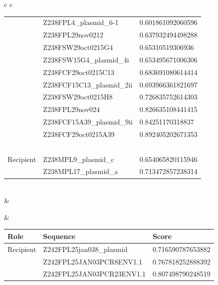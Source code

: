 \documentclass[conference]{IEEEtran}
\begin{document}
\begin{table}[]
\begin{tabular}{ c c}
\begin{tabular}{l l l}
&	Z238FPL4\_plasmid\_6-1	&	0.601861092060596	\\
&	Z238FPL29nov0212	&	0.637932494498288	\\
&	Z238FSW29oct0215G4	&	0.65310519306936	\\
&	Z238FSW15G4\_plasmid\_4i	&	0.653495671006306	\\
&	Z238FCF29oct0215C13	&	0.683691080614414	\\
&	Z238FCF15C13\_plasmid\_2ii	&	0.693966361821697	\\
&	Z238FSW29oct0215H8	&	0.726835752614303	\\
&	Z238FPL29nov024	&	0.826635108441415	\\
&	Z238FCF15A39\_plasmid\_9ii	&	0.84251170318837	\\
&	Z238FCF29oct0215A39	&	0.892405202671353	\\

	& \ &\ \\
	\hline
Recipient &	Z238MPL9\_plasmid\_c	&	0.654065820115946	\\
&	Z238MPL17\_plasmid\_a	&	0.713472857238314	\\

\end{tabular}\\
\hline
& \ \\
\begin{minipage}{.4\textwidth}
\end{minipage}
&	\begin{tabular}{l l l}
	\textbf{Role} & \textbf{Sequence} & \textbf{Score}\\
	\hline
Recipient &	Z242FPL25jan038\_plasmid	&	0.716590787653882	\\
&	Z242FPL25JAN03PCR8ENV1.1	&	0.767818252888392	\\
&	Z242FPL25JAN03PCR23ENV1.1	&	0.807498790248519	\\


\end{tabular}
\end{tabular}
\end{table}
\end{document}

